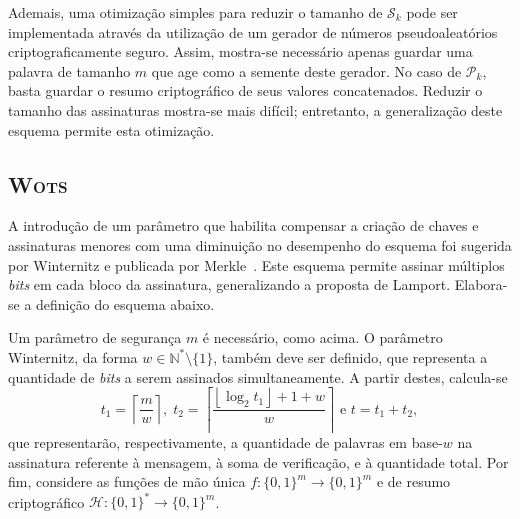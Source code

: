 \documentclass{ufsctex/ufsctex}
\newcommand{\hh}{\mathcal{H}}
\newcommand{\pk}{\mathcal{P}_k}
\newcommand{\sk}{\mathcal{S}_k}
\newcommand{\binwds}[1]{\{0, 1\}^{#1}}
\newcommand{\fhash}[1]{\hh{}: \binwds{*} \longrightarrow{} \binwds{#1}}
\newcommand{\wots}{\textsc{Wots}}
\begin{document}
Ademais, uma otimização simples para reduzir o tamanho de $\sk{}$ pode
ser implementada através da utilização de um gerador de números
pseudoaleatórios criptograficamente seguro. Assim, mostra-se necessário apenas
guardar uma palavra de tamanho $m$ que age como a semente deste gerador. No
caso de $\pk{}$, basta guardar o resumo criptográfico de seus valores
concatenados. Reduzir o tamanho das assinaturas mostra-se mais difícil;
entretanto, a generalização deste esquema permite esta otimização.

\subsection{\wots{}}\label{subsection:wots}

A introdução de um parâmetro que habilita compensar a criação de chaves e
assinaturas menores com uma diminuição no desempenho do esquema foi sugerida
por Winternitz e publicada por Merkle~\cite{Merkle:1989:CDS:118209.118230}.
Este esquema permite assinar múltiplos \emph{bits} em cada bloco da assinatura,
generalizando a proposta de Lamport. Elabora-se a definição do esquema abaixo.

Um parâmetro de segurança $m$ é necessário, como acima. O parâmetro Winternitz,
da forma $w \in \mathbb{N}^{*}\setminus\{1\}$, também deve ser definido, que
representa a quantidade de \emph{bits} a serem assinados simultaneamente.  A
partir destes, calcula-se \[t_1 = \left\lceil \frac{m}{w} \right\rceil, \; t_2
= \left\lceil \frac{\left\lfloor \log_2 t_1 \right\rfloor + 1 + w}{w}
\right\rceil \text{ e } t = t_1 + t_2,\] que representarão, respectivamente, a
quantidade de palavras em base-$w$ na assinatura referente à mensagem, à soma
de verificação, e à quantidade total.  Por fim, considere as funções de mão
única $f : \binwds{m} \longrightarrow \binwds{m}$ e de resumo criptográfico
$\fhash{m}$.
\end{document}
